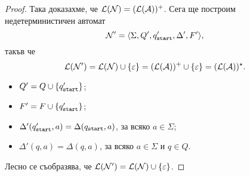 \begin{proof}
  Така доказахме, че $\mathcal{L}(\mathcal{N}) = (\mathcal{L}(\mathcal{A}))^+$.
  Сега ще построим недетерминистичен автомат
  \[\mathcal{N}' = \langle{\Sigma,Q',q_{\texttt{start}}',\Delta',F'}\rangle,\]
  такъв че
  \[\mathcal{L}(\mathcal{N}') = \mathcal{L}(\mathcal{N})\cup\{\varepsilon\} = (\mathcal{L}(\mathcal{A}))^+ \cup \{\varepsilon\} = (\mathcal{L}(\mathcal{A}))^\star.\]
  \begin{itemize}
  \item
    $Q' = Q \cup \{q_{\texttt{start}}'\}$;
  \item
    $F' = F \cup \{q_{\texttt{start}}'\}$;
  \item
    $\Delta'(q_{\texttt{start}}',a) = \Delta(q_{\texttt{start}},a)$, за всяко $a \in \Sigma$;
  \item
    $\Delta'(q,a) = \Delta(q,a)$, за всяко $a \in \Sigma$ и $q\in Q$.
  \end{itemize}
  Лесно се съобразява, че $\mathcal{L}(\mathcal{N}') = \mathcal{L}(\mathcal{N})\cup\{\varepsilon\}$.
\end{proof}


